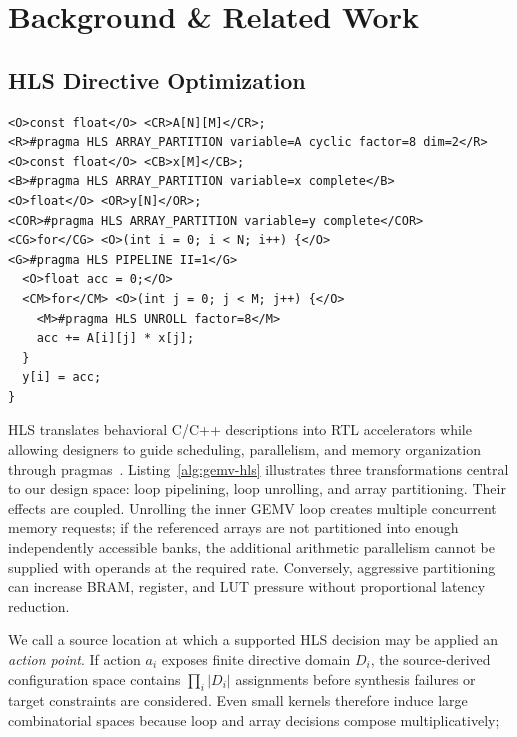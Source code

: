 \section{Background \& Related Work}
\label{sec:background}


\subsection{HLS Directive Optimization}
\label{subsec:hls-background}

\begin{lstlisting}[style=hlsalgo,float=t,
caption={GEMV HLS kernel with representative pragma configurations.},
label={alg:gemv-hls}]
<O>const float</O> <CR>A[N][M]</CR>;
<R>#pragma HLS ARRAY_PARTITION variable=A cyclic factor=8 dim=2</R>
<O>const float</O> <CB>x[M]</CB>;
<B>#pragma HLS ARRAY_PARTITION variable=x complete</B>
<O>float</O> <OR>y[N]</OR>;
<COR>#pragma HLS ARRAY_PARTITION variable=y complete</COR>
<CG>for</CG> <O>(int i = 0; i < N; i++) {</O>
<G>#pragma HLS PIPELINE II=1</G>
  <O>float acc = 0;</O>
  <CM>for</CM> <O>(int j = 0; j < M; j++) {</O>
    <M>#pragma HLS UNROLL factor=8</M>
    acc += A[i][j] * x[j];
  }
  y[i] = acc;
}
\end{lstlisting}

HLS translates behavioral C/C++ descriptions into RTL accelerators while allowing designers to guide scheduling, parallelism, and memory organization through pragmas~\cite{rupnow2011study,cong2011high}. Listing~\ref{alg:gemv-hls} illustrates three transformations central to our design space: loop pipelining, loop unrolling, and array partitioning. 
Their effects are coupled. Unrolling the inner GEMV loop creates multiple concurrent memory requests; if the referenced arrays are not partitioned into enough independently accessible banks, the additional arithmetic parallelism cannot be supplied with operands at the required rate. Conversely, aggressive partitioning can increase BRAM, register, and LUT pressure without proportional latency reduction. 

We call a source location at which a supported HLS decision may be applied an \emph{action point}. If action $a_i$ exposes finite directive domain $D_i$, the source-derived configuration space contains $\prod_i |D_i|$ assignments before synthesis failures or target constraints are considered. Even small kernels therefore induce large combinatorial spaces because loop and array decisions compose multiplicatively; 

